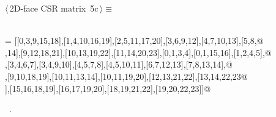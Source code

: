 \documentclass[11pt,oneside]{article}	%
\begin{document}
\begin{flushleft} \small
\begin{minipage}{\linewidth} \label{scrap11}
\protect{}$\langle\,$2D-face CSR matrix\nobreak\ {\footnotesize 5c}$\,\rangle\equiv$
\vspace{-1ex}
\begin{list}{}{} \item
\mbox{}\verb@@\\
\mbox{}\verb@FV = [[0,3,9,15,18],[1,4,10,16,19],[2,5,11,17,20],[3,6,9,12],[4,7,10,13],[5,8,@\\
\mbox{},14],[9,12,18,21],[10,13,19,22],[11,14,20,23],[0,1,3,4],[0,1,15,16],[1,2,4,5],@\\
\mbox{}\verb@[1,2,16,17],[3,4,6,7],[3,4,9,10],[4,5,7,8],[4,5,10,11],[6,7,12,13],[7,8,13,14],@\\
\mbox{}\verb@[9,10,12,13],[9,10,18,19],[10,11,13,14],[10,11,19,20],[12,13,21,22],[13,14,22,23@\\
\mbox{}\verb@],[15,16,18,19],[16,17,19,20],[18,19,21,22],[19,20,22,23]]@\\
\mbox{}\verb@@{\NWsep}
\end{list}
\vspace{-1ex}
\footnotesize\addtolength{\baselineskip}{-1ex}
\begin{list}{}{\setlength{\itemsep}{-\parsep}\setlength{\itemindent}{-\leftmargin}}
\item \NWtxtMacroRefIn\ .
\end{list}
\end{minipage}\\[4ex]
\end{flushleft}
\end{document}
